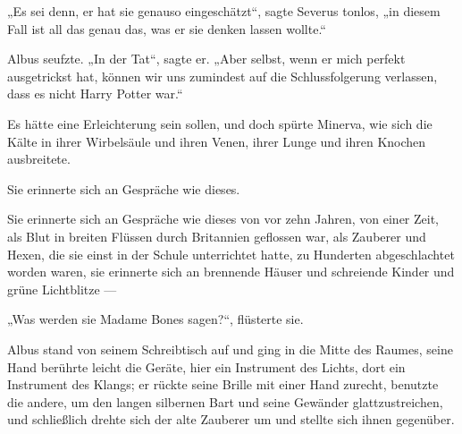 „Es sei denn, er hat sie genauso eingeschätzt“, sagte Severus tonlos, „in diesem Fall ist all das genau das, was er sie denken lassen wollte.“

Albus seufzte.
„In der Tat“, sagte er.
„Aber selbst, wenn er mich perfekt ausgetrickst hat, können wir uns zumindest auf die Schlussfolgerung verlassen, dass es nicht Harry Potter war.“

Es hätte eine Erleichterung sein sollen, und doch spürte Minerva, wie sich die Kälte in ihrer Wirbelsäule und ihren Venen, ihrer Lunge und ihren Knochen ausbreitete.

Sie erinnerte sich an Gespräche wie dieses.

Sie erinnerte sich an Gespräche wie dieses von vor zehn Jahren, von einer Zeit, als Blut in breiten Flüssen durch Britannien geflossen war, als Zauberer und Hexen, die sie einst in der Schule unterrichtet hatte, zu Hunderten abgeschlachtet worden waren, sie erinnerte sich an brennende Häuser und schreiende Kinder und grüne Lichtblitze —

„Was werden sie Madame Bones sagen?“, flüsterte sie.

Albus stand von seinem Schreibtisch auf und ging in die Mitte des Raumes, seine Hand berührte leicht die Geräte, hier ein Instrument des Lichts, dort ein Instrument des Klangs; er rückte seine Brille mit einer Hand zurecht, benutzte die andere, um den langen silbernen Bart und seine Gewänder glattzustreichen, und schließlich drehte sich der alte Zauberer um und stellte sich ihnen gegenüber.

